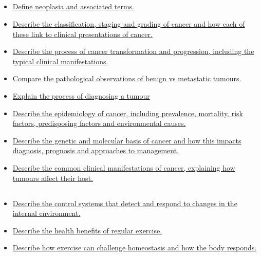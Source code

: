 \documentclass[10pt, a4paper]{article}
\begin{document}
\subsection{} \begin{itemize} \item \href{https://www.notion.so/5beec9e8e7a4432a93ffb0fbcda06208}{Define neoplasia and associated terms.} \item \href{https://www.notion.so/922359657db34ef39dab1c0ca41cf532}{Describe the classification, staging and grading of cancer and how each of these link to clinical presentations of cancer.} \item \href{https://www.notion.so/bf2f409bf0354e3997ab93814284ebe8}{Describe the process of cancer transformation and progression, including the typical clinical manifestations.} \item \href{https://www.notion.so/7dc2911963364d37a7a230dd5b61a25c}{Compare the pathological observations of benign vs metastatic tumours.} \item \href{https://www.notion.so/920fed39ff364f4d88e22c868b0fec38}{Explain the process of diagnosing a tumour} \item \href{https://www.notion.so/3cd3f543211b4226bd2652f60187f159}{Describe the epidemiology of cancer, including prevalence, mortality, risk factors, predisposing factors and environmental causes.} \item \href{https://www.notion.so/4bb46374a49341048488679d93487fc9}{Describe the genetic and molecular basis of cancer and how this impacts diagnosis, prognosis and approaches to management.} \item \href{https://www.notion.so/62bd2276a1184afc90de2e2e7220360d}{Describe the common clinical manifestations of cancer, explaining how tumours affect their host.} \end{itemize}
\subsection{} \begin{itemize} \item \href{https://www.notion.so/7a2e4f97867b4a6e85a0ae419673a29e}{Describe the control systems that detect and respond to changes in the internal environment.} \item \href{https://www.notion.so/624f6d9b36694af8aa03a3214dbdcbc4}{Describe the health benefits of regular exercise.} \item \href{https://www.notion.so/3713bba013844582b827784eb10f9f7a}{Describe how exercise can challenge homeostasis and how the body responds.} \end{itemize}
\end{document}
